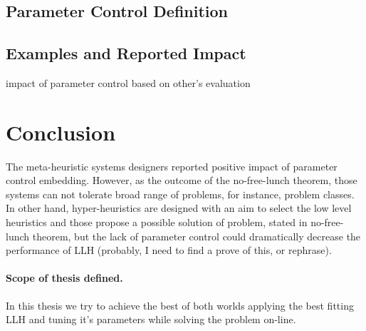 \subsection{Parameter Control Definition}
\subsection{Examples and Reported Impact}
impact of parameter control based on other's evaluation


\section{Conclusion}

The meta-heuristic systems designers reported positive impact of parameter control embedding. 
However, as the outcome of the no-free-lunch theorem, those systems can not tolerate broad range of problems, for instance, problem classes.
In other hand, hyper-heuristics are designed with an aim to select the low level heuristics and those propose a possible solution of problem, stated in no-free-lunch theorem, but the lack of parameter control could dramatically decrease the performance of LLH (probably, I need to find a prove of this, or rephrase).

\paragraph{Scope of thesis defined.} In this thesis we try to achieve the best of both worlds applying the best fitting LLH and tuning it's parameters while solving the problem on-line.
